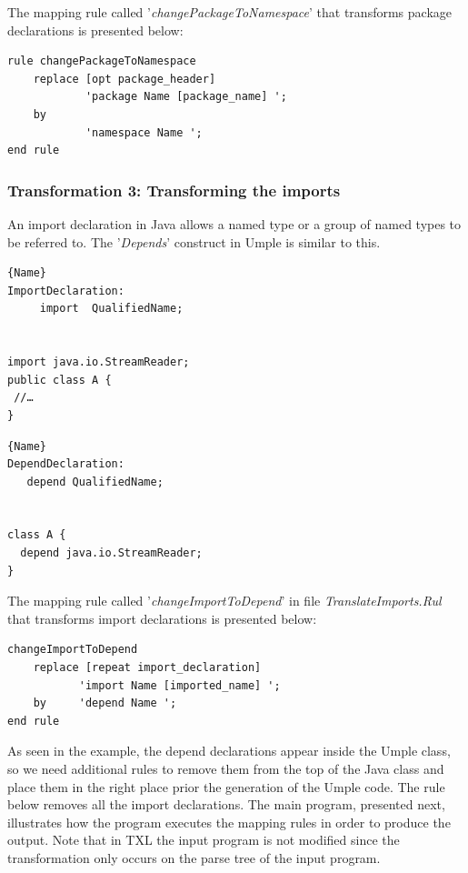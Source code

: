 The mapping rule called '\textit{changePackageToNamespace}' that transforms package declarations is presented below:

\begin{lstlisting}[style=umplePlain, label=lst:packageDeclRule3, caption=TXL mapping rule for the transformation of the package declaration]
rule changePackageToNamespace 
    replace [opt package_header]      
            'package Name [package_name] '; 
    by       
            'namespace Name '; 
end rule	
\end{lstlisting}

\subsubsection{Transformation 3: Transforming the imports} 

An import declaration in Java allows a named type or a group of named types to be referred to. The '\textit{Depends}' construct in Umple is similar to this. 

\noindent\begin{minipage}{.45\textwidth}
\begin{lstlisting}[style=umplePlain,caption=Java Import]{Name}
ImportDeclaration:
     import  QualifiedName; 


import java.io.StreamReader;
public class A {
 //…
}
\end{lstlisting}
\end{minipage}\hfill
\begin{minipage}{.45\textwidth}
\begin{lstlisting}[style=umplePlain,caption=Umple Depend]{Name}
DependDeclaration:
   depend QualifiedName;


class A {
  depend java.io.StreamReader;
}
\end{lstlisting}
\end{minipage}

The mapping rule called '\textit{changeImportToDepend}' in file \textit{TranslateImports.Rul} that transforms import declarations is presented below: 

\begin{lstlisting}[style=umplePlain, label=lst:packageDeclRule, caption=TXL mapping rule for the transformation of the import declaration] 
changeImportToDepend  	
    replace [repeat import_declaration]      
           'import Name [imported_name] '; 
    by 	   'depend Name '; 
end rule
\end{lstlisting}

As seen in the example, the depend declarations appear inside the Umple class, so we need additional rules to remove them from the top of the Java class and place them in the right place prior the generation of the Umple code. The rule below removes all the import declarations. The main program, presented next, illustrates how the program executes the mapping rules in order to produce the output. Note that in TXL the input program is not modified since the transformation only occurs on the parse tree of the input program.

